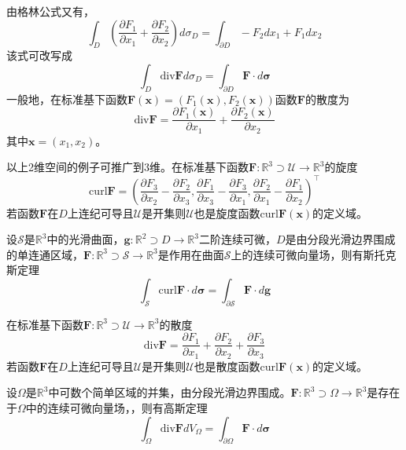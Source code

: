 \documentclass[../main.tex]{subfiles}
\begin{document}
由格林公式又有，
\[
    \int_D\left(\frac{\partial F_1}{\partial x_1}+\frac{\partial F_2}{\partial x_2}\right)d\sigma_D=\int_{\partial D}-F_2dx_1+F_1dx_2
\]
该式可改写成
\[
    \int_D\mathrm{div}\mathbf{F}d\sigma_D=\int_{\partial D}\mathbf{F}\cdot d\boldsymbol{\sigma}
\]
一般地，在标准基下函数$\mathbf{F}\left(\mathbf{x}\right)=\left(F_1\left(\mathbf{x}\right),F_2\left(\mathbf{x}\right)\right)$函数$\mathbf{F}$的散度为
\[
    \mathrm{div}\mathbf{F}=\frac{\partial F_1\left(\mathbf{x}\right)}{\partial x_1}+\frac{\partial F_2\left(\mathbf{x}\right)}{\partial x_2}
\]
其中$\mathbf{x}=\left(x_1,x_2\right)$。

以上2维空间的例子可推广到3维。在标准基下函数$\mathbf{F}:\mathbb{R}^3\supset \mathcal{U}\rightarrow\mathbb{R}^3$的旋度
\[
    \mathrm{curl}\mathbf{F}=\left(\frac{\partial F_3}{\partial x_2}-\frac{\partial F_2}{\partial x_3},\frac{\partial F_1}{\partial x_3}-\frac{\partial F_3}{\partial x_1},\frac{\partial F_2}{\partial x_1}-\frac{\partial F_1}{\partial x_2}\right)^\intercal
\]
若函数$\mathbf{F}$在$D$上连纪可导且$\mathcal{U}$是开集则$\mathcal{U}$也是旋度函数$\mathrm{curl}\mathbf{F}\left(\mathbf{x}\right)$的定义域。

设$\mathcal{S}$是$\mathbb{R}^3$中的光滑曲面，$\mathbf{g}:\mathbb{R}^2\supset D\rightarrow\mathbb{R}^3$二阶连续可微，$D$是由分段光滑边界围成的单连通区域，$\mathbf{F}:\mathbb{R}^3\supset\mathcal{S}\rightarrow\mathbb{R}^3$是作用在曲面$\mathcal{S}$上的连续可微向量场，则有斯托克斯定理
\[\int_\mathcal{S}\mathrm{curl}\mathbf{F}\cdot d\boldsymbol{\sigma}=\int_{\partial \mathcal{S}}\mathbf{F}\cdot d\mathbf{g}
\]

在标准基下函数$\mathbf{F}:\mathbb{R}^3\supset \mathcal{U}\rightarrow\mathbb{R}^3$的散度
\[
    \mathrm{div}\mathbf{F}=\frac{\partial F_1}{\partial x_1}+\frac{\partial F_2}{\partial x_2}+\frac{\partial F_3}{\partial x_3}
\]
若函数$\mathbf{F}$在$D$上连纪可导且$\mathcal{U}$是开集则$\mathcal{U}$也是散度函数$\mathrm{curl}\mathbf{F}\left(\mathbf{x}\right)$的定义域。

设$\Omega$是$\mathbb{R}^3$中可数个简单区域的并集，由分段光滑边界围成。$\mathbf{F}:\mathbb{R}^3\supset\Omega\rightarrow\mathbb{R}^3$是存在于$\Omega$中的连续可微向量场，，则有高斯定理
\[
    \int_\Omega\mathrm{div}\mathbf{F}dV_\Omega=\int_{\partial \Omega}\mathbf{F}\cdot d\boldsymbol{\sigma}
\]
\end{document}
